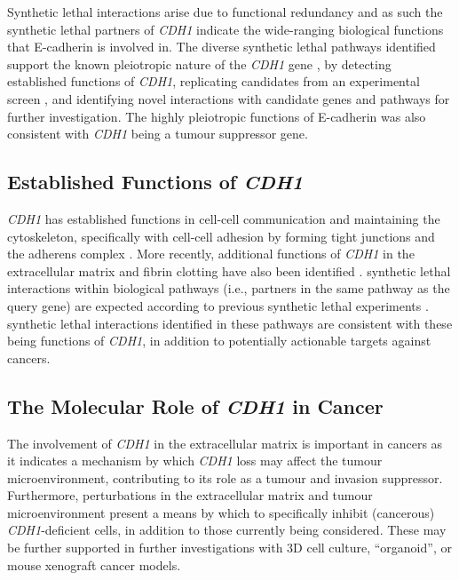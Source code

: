 Synthetic lethal interactions arise due to \gls{functional redundancy} \citep{Boone2007, Kaelin2005, Fece2015} and as such the \gls{synthetic lethal} partners of \textit{CDH1} indicate the wide-ranging biological functions that \gls{E-cadherin} is involved in. The diverse \gls{synthetic lethal} pathways identified support the known pleiotropic nature of the \textit{CDH1} gene \citep{Kroepil2012}, by detecting established functions of \textit{CDH1}, replicating candidates from an experimental screen \citep{Telford2015}, and identifying novel interactions with candidate genes and pathways for further investigation. The highly pleiotropic functions of \gls{E-cadherin} was also consistent with \textit{CDH1} being a \gls{tumour suppressor} gene. %

\subsection{Established Functions of \textit{CDH1}}
\label{chapt6:function}

\textit{CDH1} has established functions in cell-cell communication and maintaining the cytoskeleton, specifically with cell-cell adhesion by forming tight junctions and the adherens complex \citep{Jeanes2008}. More recently, additional functions of \textit{CDH1} in the extracellular matrix and fibrin clotting have also been identified \citep{Tunggal2005, Cardiff2011, Wojtukiewicz2016}. \Gls{synthetic lethal} interactions within biological pathways (i.e., partners in the same pathway as the query gene) are expected according to previous \gls{synthetic lethal} experiments \citep{Kelley2005, Boone2007}. \Gls{synthetic lethal} interactions identified in these pathways are consistent with these being functions of \textit{CDH1}, in addition to potentially actionable targets against cancers.


\subsection{The Molecular Role of \textit{CDH1} in Cancer}
\label{chapt6:cancer}

The involvement of \textit{CDH1} in the extracellular matrix is important in cancers as it indicates a mechanism by which \textit{CDH1} loss may affect the tumour microenvironment, contributing to its role as a tumour and invasion suppressor. Furthermore, perturbations in the extracellular matrix and tumour microenvironment present a means by which to specifically inhibit (cancerous) \textit{CDH1}-deficient cells, in addition to those currently being considered. 
These may be further supported in further investigations with 3D cell culture, ``organoid'', or mouse xenograft cancer models.

